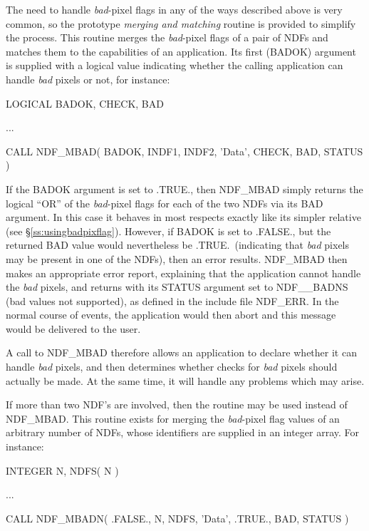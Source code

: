 \documentclass[twoside,11pt,nolof]{starlink}
\providecommand{\st}[1]{{\emph{#1}}}
\begin{document}
The need to handle \st{bad\/}-pixel flags in any of the ways described above
is very common, so the prototype \st{merging and matching\/} routine
 is provided to simplify the process.
This routine merges the \st{bad\/}-pixel flags of a pair of NDFs and matches
them to the capabilities of an application.
Its first (BADOK) argument is supplied with a logical value indicating whether
the calling application can handle \st{bad\/} pixels or not, for instance:

\small
\begin{terminalv}
      LOGICAL BADOK, CHECK, BAD

      ...

      CALL NDF_MBAD( BADOK, INDF1, INDF2, 'Data', CHECK, BAD, STATUS )
\end{terminalv}
\normalsize

If the BADOK argument is set to .TRUE., then NDF\_MBAD simply returns
the logical ``OR'' of the \st{bad\/}-pixel flags for each of the two NDFs via
its BAD argument.
In this case it behaves in most respects exactly like its simpler relative
 (see \S\ref{ss:usingbadpixflag}).
However, if BADOK is set to .FALSE., but the returned BAD value would
nevertheless be .TRUE.\ (indicating that \st{bad\/} pixels may be present in
one of the NDFs), then an error results.
NDF\_MBAD then makes an appropriate error report, explaining that the
application cannot handle the \st{bad\/} pixels, and returns with its STATUS
argument set to NDF\_\_BADNS (bad values not supported), as defined in the
include file NDF\_ERR.
In the normal course of events, the application would then abort and this
message would be delivered to the user.

A call to NDF\_MBAD therefore allows an application to declare whether it
can handle \st{bad\/} pixels, and then determines whether checks for \st{bad\/}
pixels should actually be made.
At the same time, it will handle any problems which may arise.

If more than two NDF's are involved, then the routine  may be
used instead of NDF\_MBAD.
This routine exists for merging the \st{bad}-pixel flag values of an
arbitrary number of NDFs, whose identifiers are supplied in an integer
array.
For instance:

\small
\begin{terminalv}
      INTEGER N, NDFS( N )

      ...

      CALL NDF_MBADN( .FALSE., N, NDFS, 'Data', .TRUE., BAD, STATUS )
\end{terminalv}
\normalsize
\end{document}
